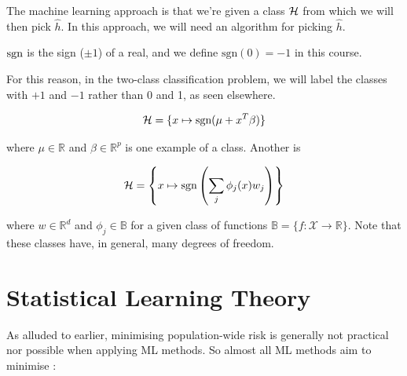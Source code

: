 \documentclass[11pt]{scrartcl}
\begin{document}
The machine learning approach is that we're given a class $\H$ from which we will then pick $\hat{h}$. In this approach, we will need an algorithm for picking $\hat{h}$.

\begin{definition}
[Sign]

$\text{sgn}$ is the sign ($\pm1$) of a real, and we define $\text{sgn}(0)=-1$ in this course.

For this reason, in the two-class classification problem, we will label the classes with $+1$ and $-1$ rather than 0 and 1, as seen elsewhere.
\end{definition}

\begin{example}[Examples of $\H$]
\begin{equation}
    \mathcal{H} = \{ x \mapsto \text{sgn} (\mu + x^T \beta) \}
    \label{L1:NN H Class}
\end{equation}

where $\mu \in \mathbb{R}$ and $\beta \in \mathbb{R}^p$ is one example of a class. Another is

\begin{equation}
    \mathcal{H} = \left\{ x \mapsto \text{sgn} \left( \sum_{j}
     \phi_j(x) w_j \right) \right\}
    \label{L1:NN H Class Phi}
\end{equation}

where $w \in \mathbb{R}^d$ and $\phi_j \in \mathbb{B}$ for a given class of functions $\mathbb{B} = \{ f : \mathcal{X} \rightarrow \mathbb{R} \}$. Note that these classes have, in general, many degrees of freedom.
\end{example}


\section{Statistical Learning Theory}

As alluded to earlier, minimising population-wide risk is generally not practical nor possible when applying ML methods. So almost all ML methods aim to minimise : %
\end{document}
